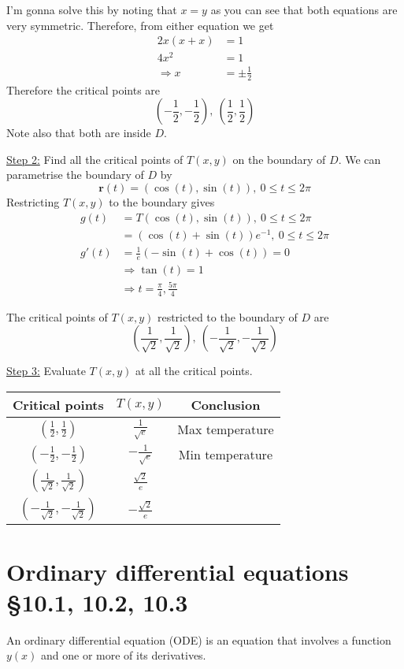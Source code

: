 \documentclass[11pt]{article}
\renewcommand{\vec}[1]{\mathbf{#1}}
\begin{document}
I'm gonna solve this by noting that $x=y$ as you can see that  both equations are very symmetric. Therefore, from either equation we get
\begin{align*}
2x ( x + x) &= 1  \\
4x^2 &= 1 \\
\Rightarrow x &= \pm \frac{1}{2}
\end{align*}
Therefore the critical points are 
\[ \left(-\frac{1}{2}, -\frac{1}{2}\right),\ \left( \frac{1}{2}, \frac{1}{2} \right) \]
Note also that both are inside $D$.

\underline{Step 2:} Find all the critical points of $T(x, y)$ on the boundary of $D$. We can parametrise the boundary of $D$ by 
\[ \vec{r}(t) = (\cos(t), \sin(t)),\ 0 \leq t \leq 2\pi \]
Restricting $T(x, y)$ to the boundary gives
\begin{align*}
g(t) &= T(\cos(t), \sin(t) ),\ 0 \leq t \leq 2\pi \\
&= (\cos(t) + \sin(t))e^{-1},\ 0 \leq t \leq 2\pi \\
g'(t) &= \frac{1}{e}(-\sin(t) + \cos(t)) = 0 \\
&\Rightarrow \tan(t) = 1 \\
&\Rightarrow t = \frac{\pi}{4}, \frac{5\pi}{4}
\end{align*}

The critical points of $T(x,y)$ restricted to the boundary of $D$ are
\[ \left( \frac{1}{\sqrt{2}}, \frac{1}{\sqrt{2}} \right),\ \left( -\frac{1}{\sqrt{2}}, -\frac{1}{\sqrt{2}} \right) \]

\underline{Step 3:} Evaluate $T(x,y)$ at all the critical points.

\begin{center}
\begin{tabular}{c|c|c}
Critical points & $T(x, y)$ & Conclusion \\
\hline
$(\frac{1}{2}, \frac{1}{2})$ & $\frac{1}{\sqrt{e}}$ & Max temperature \\ 
$(-\frac{1}{2}, -\frac{1}{2})$ & $-\frac{1}{\sqrt{e}}$ & Min temperature \\
$(\frac{1}{\sqrt{2}}, \frac{1}{\sqrt{2}})$ & $\frac{\sqrt{2}}{e}$ \\
$(-\frac{1}{\sqrt{2}}, -\frac{1}{\sqrt{2}})$ & $-\frac{\sqrt{2}}{e}$
\end{tabular}
\end{center}

\section{Ordinary differential equations §10.1, 10.2, 10.3}
An ordinary differential equation (ODE) is an equation that involves a function $y(x)$ and one or more of its derivatives.
\end{document}
